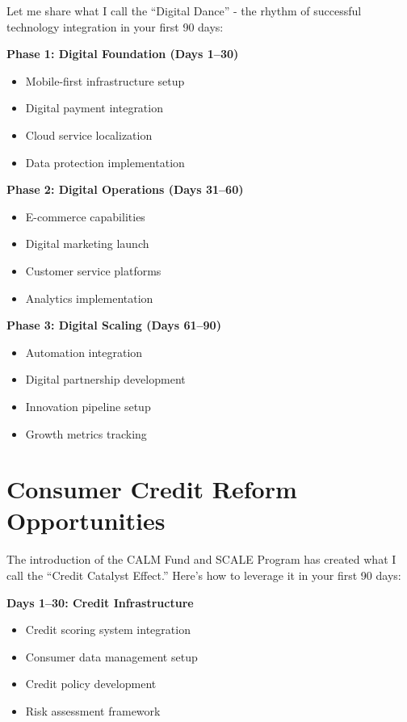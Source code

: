 Let me share what I call the ``Digital Dance'' - the rhythm of successful technology integration in your first 90 days:

\textbf{Phase 1: Digital Foundation (Days 1--30)}
\begin{itemize}
    \item Mobile-first infrastructure setup
    \item Digital payment integration
    \item Cloud service localization
    \item Data protection implementation
\end{itemize}

\textbf{Phase 2: Digital Operations (Days 31--60)}
\begin{itemize}
    \item E-commerce capabilities
    \item Digital marketing launch
    \item Customer service platforms
    \item Analytics implementation
\end{itemize}

\textbf{Phase 3: Digital Scaling (Days 61--90)}
\begin{itemize}
    \item Automation integration
    \item Digital partnership development
    \item Innovation pipeline setup
    \item Growth metrics tracking
\end{itemize}

\section{Consumer Credit Reform Opportunities}\label{sec:consumer-credit-opportunities}

The introduction of the CALM Fund and SCALE Program has created what I call the ``Credit Catalyst Effect.'' Here's how to leverage it in your first 90 days:

\textbf{Days 1--30: Credit Infrastructure}
\begin{itemize}
    \item Credit scoring system integration
    \item Consumer data management setup
    \item Credit policy development
    \item Risk assessment framework
\end{itemize}

